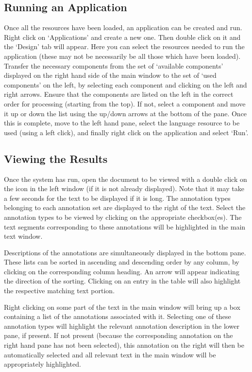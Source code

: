 \subsection{Running an Application}

Once all the resources have been loaded, an application can be created
and run. Right click on `Applications' and create a new
one. Then double click on it and the `Design' tab will appear. Here you can
select the resources needed to run the application (these may
not be necessarily be all those which have been loaded). Transfer the
necessary components from the set of `available components' displayed on
the right hand side of the main window to the set of `used components'
on the left, by selecting each component and clicking on the left and
right arrows. Ensure that the components are listed on the left in the
correct order for processing (starting from the top). If not, select a
component and move it up or down the list using the up/down arrows at the
bottom of the pane. Once this is complete, move to the left hand pane,
select the language resource to be used (using a left click), and
finally right click on the application and select `Run'.


\subsection{Viewing the Results}

Once the system has run, open the document to be
viewed with a double click on the icon in the left window (if it is
not already displayed). Note that it may take a few seconds for the
text to be displayed if it is long.
The annotation types belonging to each annotation set are displayed to
the right of the text. Select the annotation types to be viewed by
clicking on the appropriate checkbox(es). The text segments
corresponding to these annotations will be highlighted in the main text window.  

Descriptions of the annotations are simultaneously displayed in the
bottom pane. These lists can be sorted in ascending and descending
order by any column, by clicking on the corresponding column
heading. An arrow will appear indicating the direction of the sorting.
Clicking on an entry in the table will also highlight the respective
matching text portion.

Right clicking on some part of the text in the main window will bring
up a box containing a list of the annotations associated with
it. Selecting one of these annotation types will highlight the
relevant annotation description in the lower pane, if present. If not
present (because the corresponding annotation on the right hand pane
has not been selected), this annotation on the right will then be
automatically selected and all relevant text in the main window will be
appropriately highlighted.

